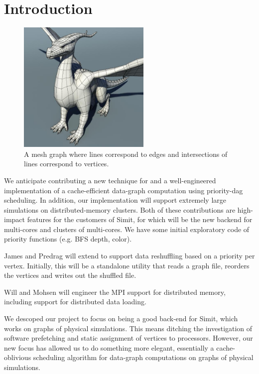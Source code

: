 \section{Introduction}
\label{sec:intro}



\begin{figure}[!t]
\centering
\includegraphics[width=2.5in]{dragon}
\caption{A mesh graph where lines correspond to edges and intersections of lines correspond to vertices.}
\label{fig:mesh}
\end{figure}


We anticipate contributing a new technique for and a well-engineered
implementation of a cache-efficient data-graph computation using
priority-dag scheduling.  In addition, our implementation will support
extremely large simulations on distributed-memory clusters.  Both
of these contributions are high-impact features for the customers
of Simit, for which  will be the new backend for multi-cores
and clusters of multi-cores.  We have some initial exploratory code
of priority functions (e.g. BFS depth, color).  


James and Predrag will extend  to support data reshuffling
based on a priority per vertex.  Initially, this will be a standalone
utility that reads a graph file, reorders the vertices and writes out
the shuffled file.  

Will and Mohsen will engineer the MPI support for distributed memory,
including support for distributed data loading.


We descoped our project to focus on being a good back-end for Simit, which
works on graphs of physical simulations.  This means ditching the investigation
of software prefetching and static assignment of vertices to processors.
However, our new focus has allowed us to do something more elegant, essentially
a cache-oblivious scheduling algorithm for data-graph computations on graphs
of physical simulations.

